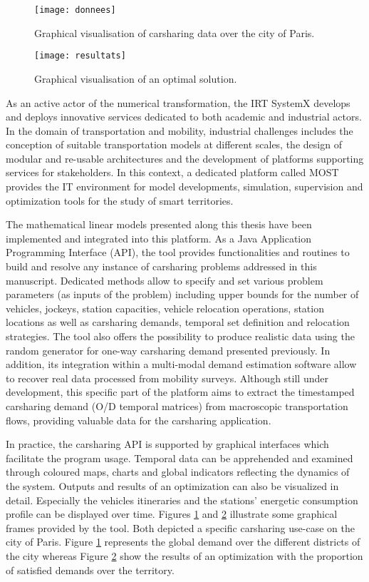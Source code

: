 \begin{figure}[t]
\texttt{[image: donnees]}
\caption{Graphical visualisation of carsharing data over the city of Paris.}
\label{fig:donnees}
\end{figure}

\begin{figure}[t]
\texttt{[image: resultats]}
\caption{Graphical visualisation of an optimal solution.}
\label{fig:resultats}
\end{figure}

As an active actor of the numerical transformation, the IRT SystemX develops and deploys innovative services dedicated to both academic and industrial actors.
In the domain of transportation and mobility, industrial challenges includes the conception of suitable transportation models at different scales, the design of modular and re-usable architectures and the development of platforms supporting services for stakeholders.
In this context, a dedicated platform called MOST provides the IT environment for model developments, simulation, supervision and optimization tools for the study of smart territories.

\medskip
The mathematical linear models presented along this thesis have been implemented and integrated into this platform.
As a Java Application Programming Interface (API), the tool provides functionalities and routines to build and resolve any instance of carsharing problems addressed in this manuscript.
Dedicated methods allow to specify and set various problem parameters (as inputs of the problem) including upper bounds for the number of vehicles, jockeys, station capacities, vehicle relocation operations, station locations as well as carsharing demands, temporal set definition and relocation strategies.
The tool also offers the possibility to produce realistic data using the random generator for one-way carsharing demand presented previously.
In addition, its integration within a multi-modal demand estimation software allow to recover real data processed from mobility surveys.
Although still under development, this specific part of the platform aims to extract the timestamped carsharing demand (O/D temporal matrices) from macroscopic transportation flows, providing valuable data for the carsharing application.

\medskip
In practice, the carsharing API is supported by graphical interfaces which facilitate the program usage.
Temporal data can be apprehended and examined through coloured maps, charts and global indicators reflecting the dynamics of the system.
Outputs and results of an optimization can also be visualized in detail.
Especially the vehicles itineraries and the stations' energetic consumption profile can be displayed over time.
Figures \ref{fig:donnees} and \ref{fig:resultats} illustrate some graphical frames provided by the tool.
Both depicted a specific carsharing use-case on the city of Paris.
Figure \ref{fig:donnees} represents the global demand over the different districts of the city whereas Figure \ref{fig:resultats} show the results of an optimization with the proportion of satisfied demands over the territory.



